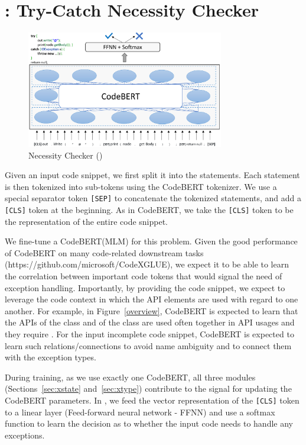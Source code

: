 \section{{\xblock}: Try-Catch Necessity Checker}
\label{xblock:sec}

\begin{figure}[t]
 	\centering
 	\includegraphics[width=3.4in]{xblock-3.png}
        \vspace{-20pt}
 	\caption{ Necessity Checker ({\xblock})}
 	\label{fig:xblock}	
\end{figure}

Given an input code snippet, we first split it into the
statements. Each statement is then tokenized into sub-tokens using the
CodeBERT tokenizer. We use a special separator token \texttt{[SEP]} to
concatenate the tokenized statements, and add a \texttt{[CLS]} token
at the beginning. As in CodeBERT, we take the \texttt{[CLS]} token to
be the representation of the entire code snippet.

We fine-tune a CodeBERT(MLM) for this problem.  Given the good
performance of CodeBERT on many code-related downstream tasks
(https://github.com/microsoft/CodeXGLUE), we expect it to be able to
learn the correlation between important code tokens that would signal
the need of exception handling. Importantly, by providing the code
snippet, we expect to leverage the code context in which the API
elements are used with regard to one another. For example, in
Figure~\ref{overview}, CodeBERT is expected to learn that the APIs
 of the class  and 
of the class  are used often together in API
usages and they require . For the input incomplete
code snippet, CodeBERT is expected to learn such relations/connections
to avoid name ambiguity and to connect them with the exception types.


During training, as we use exactly one CodeBERT, all three modules
(Sections~\ref{sec:xstate} and~\ref{sec:xtype}) contribute
to the signal for updating the CodeBERT parameters. In {\xblock}, we
feed the vector representation of the \texttt{[CLS]} token to a linear
layer (Feed-forward neural network - FFNN) and use a softmax function
to learn the decision as to whether the input code needs to handle any
exceptions.

